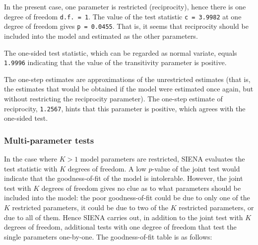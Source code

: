 \documentclass[a4paper,fleqn,11pt]{article}
\newcommand{\+}{\, + \,}
\newcommand{\SI}{{\sf SIENA }}
\begin{document}
In the present case, one parameter is restricted (reciprocity),
hence there is one degree of freedom {\tt d.f.\ = 1}. The value of
the test statistic {\tt c = 3.9982} at one degree of freedom
gives {\tt p = 0.0455}.
That is, it seems that reciprocity
should be included into the model and estimated as the other
parameters.

The one-sided test statistic, which can be regarded as normal variate, equals {\tt 1.9996}
indicating that the value of the transitivity parameter is positive.

The one-step estimates are approximations of the unrestricted estimates (that is,
the estimates that would be obtained if the model were estimated once again,
but without restricting the reciprocity parameter).
The one-step estimate of reciprocity, {\tt 1.2567},
hints that this parameter is positive,
which agrees with the one-sided test.

\subsubsection{Multi-parameter tests}

In the case where $K > 1$ model parameters are restricted, \SI
evaluates the test statistic with $K$ degrees of freedom. A low
$p$-value of the joint test would indicate that the
goodness-of-fit of the model is intolerable. However, the joint
test with $K$ degrees of freedom gives no clue as to what parameters
should be included into the model: the poor goodness-of-fit could be
due to only one of the $K$ restricted parameters, it could be due to
two of the $K$ restricted parameters, or due to all of them. Hence
\SI carries out, in addition to the joint test with $K$ degrees of
freedom, additional tests with one degree of freedom that test the
single parameters one-by-one. The goodness-of-fit table is as
follows:
\end{document}
